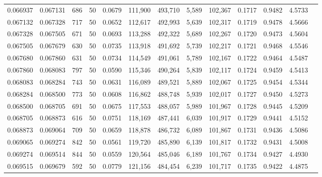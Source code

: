 \begin{tabular}{rrrrrrrrrrrrr}
0.066937 & 0.067131 &   686 &  50 &                                     0.0679 & 111,900 & 493,710 &   5,589 & 102,367 & 0.1717 & 0.9482 & 4.5733 \\
0.067132 & 0.067328 &   717 &  50 &                                     0.0652 & 112,617 & 492,993 &   5,639 & 102,317 & 0.1719 & 0.9478 & 4.5666 \\
0.067328 & 0.067505 &   671 &  50 &                                     0.0693 & 113,288 & 492,322 &   5,689 & 102,267 & 0.1720 & 0.9473 & 4.5604 \\
0.067505 & 0.067679 &   630 &  50 &                                     0.0735 & 113,918 & 491,692 &   5,739 & 102,217 & 0.1721 & 0.9468 & 4.5546 \\
0.067680 & 0.067860 &   631 &  50 &                                     0.0734 & 114,549 & 491,061 &   5,789 & 102,167 & 0.1722 & 0.9464 & 4.5487 \\
0.067860 & 0.068083 &   797 &  50 &                                     0.0590 & 115,346 & 490,264 &   5,839 & 102,117 & 0.1724 & 0.9459 & 4.5413 \\
0.068083 & 0.068284 &   743 &  50 &                                     0.0631 & 116,089 & 489,521 &   5,889 & 102,067 & 0.1725 & 0.9454 & 4.5344 \\
0.068284 & 0.068500 &   773 &  50 &                                     0.0608 & 116,862 & 488,748 &   5,939 & 102,017 & 0.1727 & 0.9450 & 4.5273 \\
0.068500 & 0.068705 &   691 &  50 &                                     0.0675 & 117,553 & 488,057 &   5,989 & 101,967 & 0.1728 & 0.9445 & 4.5209 \\
0.068705 & 0.068873 &   616 &  50 &                                     0.0751 & 118,169 & 487,441 &   6,039 & 101,917 & 0.1729 & 0.9441 & 4.5152 \\
0.068873 & 0.069064 &   709 &  50 &                                     0.0659 & 118,878 & 486,732 &   6,089 & 101,867 & 0.1731 & 0.9436 & 4.5086 \\
0.069065 & 0.069274 &   842 &  50 &                                     0.0561 & 119,720 & 485,890 &   6,139 & 101,817 & 0.1732 & 0.9431 & 4.5008 \\
0.069274 & 0.069514 &   844 &  50 &                                     0.0559 & 120,564 & 485,046 &   6,189 & 101,767 & 0.1734 & 0.9427 & 4.4930 \\
0.069515 & 0.069679 &   592 &  50 &                                     0.0779 & 121,156 & 484,454 &   6,239 & 101,717 & 0.1735 & 0.9422 & 4.4875 \\

\end{tabular}

